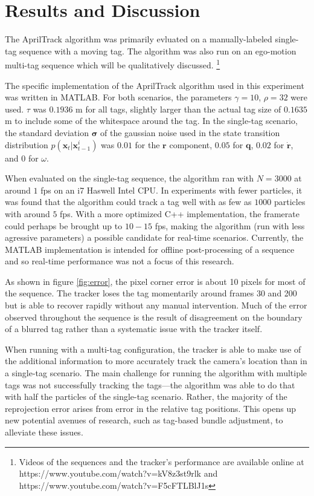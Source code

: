 \documentclass[letterpaper, 10 pt, conference]{ieeeconf}
\renewcommand{\vec}[1]{\boldsymbol{#1}}
\begin{document}
\section{Results and Discussion}

The AprilTrack algorithm was primarily evluated on a manually-labeled single-tag sequence with a moving tag. The algorithm was also run on an ego-motion multi-tag sequence which will be qualitatively discussed.
\footnote{Videos of the sequences and the tracker's performance are available online at https://www.youtube.com/watch?v=kV8z3st9rlk and https://www.youtube.com/watch?v=F5cFTLBlJ1s }


The specific implementation of the AprilTrack algorithm used in this experiment was written in MATLAB. For both scenarios, the parameters $\gamma = 10$, $\rho=32$ were used. $\tau$ was $0.1936$ m for all tags, slightly larger than the actual tag size of $0.1635$ m to include some of the whitespace around the tag. In the single-tag scenario, the standard deviation $\vec{\sigma}$  of the gaussian noise used in the state transition distribution $p(\vec{x}_t|\vec{x}^i_{t-1})$ was $0.01$ for the $\vec{r}$ component, $0.05$ for $\vec{q}$, $0.02$ for $\dot{\vec{r}}$, and $0$ for $\omega$.


When evaluated on the single-tag sequence, the algorithm ran with $N=3000$ at around $1$ fps on an i7 Haswell Intel CPU. In experiments with fewer particles, it was found that the algorithm could track a tag well with as few as $1000$ particles with around $5$ fps. With a more optimized C++ implementation, the framerate could perhaps be brought up to $10-15$ fps, making the algorithm (run with less agressive parameters) a possible candidate for real-time scenarios. Currently, the MATLAB implementation is intended for offline post-processing of a sequence and so real-time performance was not a focus of this research.


As shown in figure \ref{fig:error}, the pixel corner error is about 10 pixels for most of the sequence. The tracker loses the tag momentarily around frames 30 and 200 but is able to recover rapidly without any manual intervention. Much of the error observed throughout the sequence is the result of disagreement on the boundary of a blurred tag rather than a systematic issue with the tracker itself.

When running with a multi-tag configuration, the tracker is able to make use of the additional information to more accurately track the camera's location than in a single-tag scenario. The main challenge for running the algorithm with multiple tags was not successfully tracking the tags---the algorithm was able to do that with half the particles of the single-tag scenario. Rather, the majority of the reprojection error arises from error in the relative tag positions. This opens up new potential avenues of research, such as tag-based bundle adjustment, to alleviate these issues.
\end{document}
